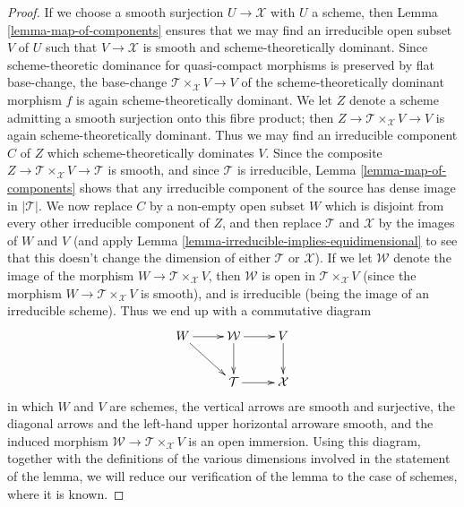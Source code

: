 \documentclass[10pt,a4paper]{amsart}
\theoremstyle{plain}
\theoremstyle{definition}
\theoremstyle{remark}
\numberwithin{equation}{subsection}
\begin{document}
\begin{proof}
\medskip\noindent
If we choose a smooth surjection $U \to \mathcal{X}$ with $U$ a scheme,
then Lemma \ref{lemma-map-of-components} ensures that
we may find an irreducible open subset $V$ of $U$ such
that $V \to \mathcal{X}$ is smooth and scheme-theoretically dominant.
Since scheme-theoretic dominance for quasi-compact morphisms
is preserved by flat base-change,
the base-change $\mathcal{T} \times_{\mathcal{X}} V \to V$
of the scheme-theoretically
dominant morphism $f$ is again
scheme-theoretically dominant.   We let $Z$ denote a scheme
admitting a smooth surjection onto this fibre product;
then $Z \to \mathcal{T} \times_{\mathcal{X}} V \to V$
is again scheme-theoretically dominant.
Thus we may find an irreducible
component $C$ of $Z$ which scheme-theoretically
dominates $V$.
Since the composite  $Z \to \mathcal{T}\times_{\mathcal{X}} V \to \mathcal{T}$
is smooth,
and since $\mathcal{T}$ is irreducible,
Lemma \ref{lemma-map-of-components} shows that any irreducible
component of the source has dense image in $|\mathcal{T}|$.
We now replace
$C$ by a non-empty open subset $W$ which is disjoint from every other
irreducible component of $Z$, and
then replace $\mathcal{T}$ and $\mathcal{X}$ by the images of $W$
and $V$
(and apply Lemma \ref{lemma-irreducible-implies-equidimensional}
to see that this
doesn't change the dimension of either $\mathcal{T}$ or $\mathcal{X}$).
If we let $\mathcal{W}$ denote the image of the morphism
$W \to \mathcal{T}\times_{\mathcal{X}} V$,
then $\mathcal{W}$ is open in $\mathcal{T}\times_{\mathcal{X}} V$ (since the
morphism $W \to \mathcal{T}\times_{\mathcal{X}} V$ is smooth),
and is irreducible (being the image of an irreducible
scheme).  Thus we end up with a commutative diagram
$$
\xymatrix{
W \ar[dr] \ar[r]  & \mathcal{W} \ar[r] \ar[d] & V \ar[d] \\
& \mathcal{T} \ar[r] & \mathcal{X}
}
$$
in which $W$ and $V$ are schemes,
the vertical arrows are smooth and surjective,
the diagonal arrows and the left-hand
upper horizontal arroware smooth,
and the induced morphism $\mathcal{W} \to \mathcal{T}\times_{\mathcal{X}} V$ is
an open immersion. Using this diagram, together with the definitions
of the various dimensions involved in
the statement of the lemma, we will reduce our verification
of the lemma to the case of schemes, where it is known.


\end{proof}
\end{document}
